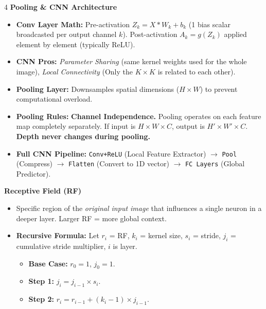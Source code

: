 \documentclass[8pt,landscape,a4paper]{extarticle}
\begin{document}
\begin{multicols*}{4}
\vspace{1mm}
\noindent\textbf{Pooling \& CNN Architecture}
\begin{itemize}[leftmargin=*, nosep]
    \item \textbf{Conv Layer Math:} Pre-activation $Z_k = X * W_k + b_k$ (1 bias scalar broadcasted per output channel $k$). Post-activation $A_k = g(Z_k)$ applied element by element (typically ReLU).
    \item \textbf{CNN Pros:} \textit{Parameter Sharing} (same kernel weights used for the whole image), \textit{Local Connectivity} (Only the $K \times K$ is related to each other).
    \item \textbf{Pooling Layer:} Downsamples spatial dimensions ($H \times W$) to prevent computational overload. 
    \item \textbf{Pooling Rules:} \textbf{Channel Independence.} Pooling operates on each feature map completely separately. If input is $H \times W \times C$, output is $H' \times W' \times C$. \textbf{Depth never changes during pooling.}
    \item \textbf{Full CNN Pipeline:} \texttt{Conv+ReLU} (Local Feature Extractor) $\rightarrow$ \texttt{Pool} (Compress) $\rightarrow$ \texttt{Flatten} (Convert to 1D vector) $\rightarrow$ \texttt{FC Layers} (Global Predictor).
\end{itemize}

\vspace{1mm}
\noindent\textbf{Receptive Field (RF)}
\begin{itemize}[leftmargin=*, nosep]
    \item Specific region of the \textit{original input image} that influences a single neuron in a deeper layer. Larger RF = more global context.
    \item \textbf{Recursive Formula:} Let $r_i$ = RF, $k_i$ = kernel size, $s_i$ = stride, $j_i$ = cumulative stride multiplier, $i$ is layer.
    \begin{itemize}[leftmargin=*, nosep]
        \item \textbf{Base Case:} $r_0 = 1$, $j_0 = 1$.
        \item \textbf{Step 1:} $j_i = j_{i-1} \times s_i$.
        \item \textbf{Step 2:} $r_i = r_{i-1} + (k_i - 1) \times j_{i-1}$.
    \end{itemize}
\end{itemize}


\end{multicols*}
\end{document}
